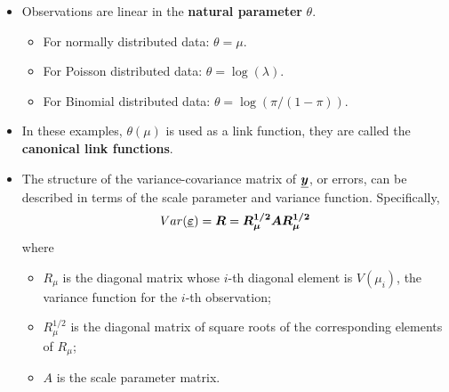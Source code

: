\begin{frame}
  \begin{itemize}
    \vspace{0.75cm}
    \item Observations are linear in the \textbf{natural parameter} $ \theta $.
      \begin{itemize}
        \vspace{0.25cm}
        \item For normally distributed data: $ \theta = \mu $.
        \vspace{0.25cm}
        \item For Poisson distributed data: $ \theta = \log(\lambda) $.
        \vspace{0.25cm}
        \item For Binomial distributed data: $ \theta = \log(\pi/(1-\pi)) $.
      \end{itemize}
    \vspace{0.75cm}
    \item In these examples, $ \theta(\mu) $ is used as a link function, they are called the \textbf{canonical link functions}.
  \end{itemize}
\end{frame}




\begin{frame}
  \begin{itemize}
    \vspace{0.75cm}
    \item The structure of the variance-covariance matrix of $ \boldsymbol{\underline{y}} $, or errors, can be described in terms of the scale parameter and variance function. Specifically,
      $$ Var(\boldsymbol{\underline{\varepsilon}}) = \boldsymbol{R} = \boldsymbol{R_\mu^{1/2}} \boldsymbol{A} \boldsymbol{R_\mu^{1/2}} $$
      where
      \begin{itemize}
        \vspace{0.25cm}
        \item $ R_\mu $ is the diagonal matrix whose $i$-th diagonal element is $ V(\mu_i) $, the variance function for the $i$-th observation;
        \vspace{0.25cm}
        \item $ R_\mu^{1/2} $ is the diagonal matrix of square roots of the corresponding elements of $ R_\mu $;
        \vspace{0.25cm}
        \item $ A $ is the scale parameter matrix.
      \end{itemize}
  \end{itemize}
\end{frame}

